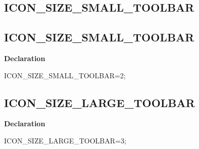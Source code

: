 \documentclass{report}
\newif\ifpdf
\begin{document}
\subsection*{\large{\textbf{ICON{\_}SIZE{\_}SMALL{\_}TOOLBAR}}\normalsize\hspace{1ex}\hrulefill}
\else
\subsection*{ICON{\_}SIZE{\_}SMALL{\_}TOOLBAR}
\fi
\label{licommon-ICON_SIZE_SMALL_TOOLBAR}
\begin{list}{}{
\setlength{\itemindent}{0cm}
\setlength{\listparindent}{0cm}
\setlength{\leftmargin}{\evensidemargin}
\addtolength{\leftmargin}{\tmplength}
\settowidth{\labelsep}{X}
\addtolength{\leftmargin}{\labelsep}
\setlength{\labelwidth}{\tmplength}
}
\item[\textbf{Declaration}\hfill]
\ifpdf
\begin{flushleft}
\fi
\begin{ttfamily}
ICON{\_}SIZE{\_}SMALL{\_}TOOLBAR=2;\end{ttfamily}

\ifpdf
\end{flushleft}
\fi

\end{list}
\ifpdf
\subsection*{\large{\textbf{ICON{\_}SIZE{\_}LARGE{\_}TOOLBAR}}\normalsize\hspace{1ex}\hrulefill}
\else
\subsection*{ICON{\_}SIZE{\_}LARGE{\_}TOOLBAR}
\fi
\label{licommon-ICON_SIZE_LARGE_TOOLBAR}
\begin{list}{}{
\setlength{\itemindent}{0cm}
\setlength{\listparindent}{0cm}
\setlength{\leftmargin}{\evensidemargin}
\addtolength{\leftmargin}{\tmplength}
\settowidth{\labelsep}{X}
\addtolength{\leftmargin}{\labelsep}
\setlength{\labelwidth}{\tmplength}
}
\item[\textbf{Declaration}\hfill]
\ifpdf
\begin{flushleft}
\fi
\begin{ttfamily}
ICON{\_}SIZE{\_}LARGE{\_}TOOLBAR=3;\end{ttfamily}

\ifpdf
\end{flushleft}
\fi

\end{list}
\ifpdf
\end{document}
